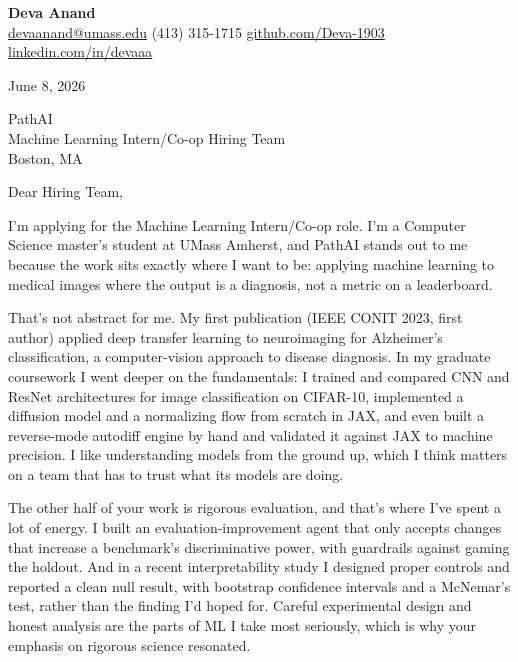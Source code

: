 \documentclass[letterpaper,11pt]{article}
\begin{document}
\begin{center}
  {\LARGE \bfseries \textcolor{ResumeNavy}{Deva Anand}} \\[3pt]
  {\small
  \href{mailto:devaanand@umass.edu}{devaanand@umass.edu} \enspace\textbar\enspace
  (413) 315-1715 \enspace\textbar\enspace
  \href{https://github.com/Deva-1903}{github.com/Deva-1903} \enspace\textbar\enspace
  \href{https://linkedin.com/in/devaaa/}{linkedin.com/in/devaaa}}
\end{center}
\vspace{6pt}

June 8, 2026

\vspace{2pt}
PathAI \\
Machine Learning Intern/Co-op Hiring Team \\
Boston, MA

\vspace{6pt}
Dear Hiring Team,

I'm applying for the Machine Learning Intern/Co-op role. I'm a Computer Science master's student at UMass Amherst, and PathAI stands out to me because the work sits exactly where I want to be: applying machine learning to medical images where the output is a diagnosis, not a metric on a leaderboard.

That's not abstract for me. My first publication (IEEE CONIT 2023, first author) applied deep transfer learning to neuroimaging for Alzheimer's classification, a computer-vision approach to disease diagnosis. In my graduate coursework I went deeper on the fundamentals: I trained and compared CNN and ResNet architectures for image classification on CIFAR-10, implemented a diffusion model and a normalizing flow from scratch in JAX, and even built a reverse-mode autodiff engine by hand and validated it against JAX to machine precision. I like understanding models from the ground up, which I think matters on a team that has to trust what its models are doing.

The other half of your work is rigorous evaluation, and that's where I've spent a lot of energy. I built an evaluation-improvement agent that only accepts changes that increase a benchmark's discriminative power, with guardrails against gaming the holdout. And in a recent interpretability study I designed proper controls and reported a clean null result, with bootstrap confidence intervals and a McNemar's test, rather than the finding I'd hoped for. Careful experimental design and honest analysis are the parts of ML I take most seriously, which is why your emphasis on rigorous science resonated.
\end{document}

